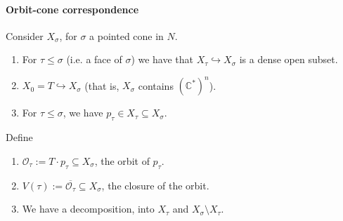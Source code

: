 \documentclass[a4paper,12pt]{amsart}
\newcommand{\CC}{\mathbb{C}}
\begin{document}
\paragraph{Orbit-cone correspondence}
Consider $X_\sigma$, for $\sigma$ a pointed cone in $N$. 
\begin{enumerate}
\item For $\tau \leq \sigma$ (i.e. a face of $\sigma$) we have that $X_\tau \hookrightarrow X_\sigma$ is a dense open subset. 
\item $X_0 = T \hookrightarrow X_\sigma$ (that is, $X_\sigma$ contains $(\CC^*)^n$).
\item For $\tau \leq \sigma$, we have $p_\tau \in X_\tau \subseteq X_\sigma$.
\end{enumerate}
Define
\begin{enumerate}
\item $\mathcal{O}_\tau := T \cdot p_\tau \subseteq X_\sigma$, the orbit of $p_\tau$.  
\item $V(\tau) := \overline{\mathcal{O}_\tau} \subseteq X_\sigma$, the closure of the orbit.
\item We have a decomposition, into $X_\tau$ and $X_\sigma \setminus X_\tau$.
\end{enumerate}
\end{document}

